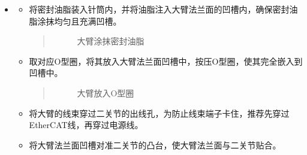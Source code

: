\documentclass[a4paper,11pt,english,openany,oneside]{sphinxmanual}
\begin{document}
\begin{itemize}
\begin{itemize}
\item {} 
\sphinxAtStartPar
将固定关节的外六角螺栓和垫片放入一关节的螺纹孔中，并使用开口扳手按对角顺序拧紧螺栓。扳手和螺栓的规格参考 {\hyperref[\detokenize{_u66f4_u6362_u5173_u8282:id9}]{}} 。
\begin{quote}

\begin{figure}[H]
\centering
\capstart

\noindent{}
\caption{拧紧一关节螺钉}\label{\detokenize{_u66f4_u6362_u5173_u8282:id131}}\end{figure}
\end{quote}

\end{itemize}

\item {} 
\sphinxAtStartPar
{}
\begin{itemize}
\item {} 
\sphinxAtStartPar
将密封油脂装入针筒内，并将油脂注入大臂法兰面的凹槽内，确保密封油脂涂抹均匀且充满凹槽。
\begin{quote}

\begin{figure}[H]
\centering
\capstart

\noindent{}
\caption{大臂涂抹密封油脂}\label{\detokenize{_u66f4_u6362_u5173_u8282:id132}}\end{figure}
\end{quote}

\item {} 
\sphinxAtStartPar
取对应O型圈，将其放入大臂法兰面凹槽中，按压O型圈，使其完全嵌入到凹槽中。
\begin{quote}

\begin{figure}[H]
\centering
\capstart

\noindent{}
\caption{大臂放入O型圈}\label{\detokenize{_u66f4_u6362_u5173_u8282:id133}}\end{figure}
\end{quote}

\item {} 
\sphinxAtStartPar
将大臂的线束穿过二关节的出线孔，为防止线束端子卡住，推荐先穿过EtherCAT线，再穿过电源线。

\item {} 
\sphinxAtStartPar
将大臂法兰面凹槽对准二关节的凸台，使大臂法兰面与二关节贴合。
\begin{quote}


\end{quote}
\end{itemize}
\end{itemize}
\end{document}

